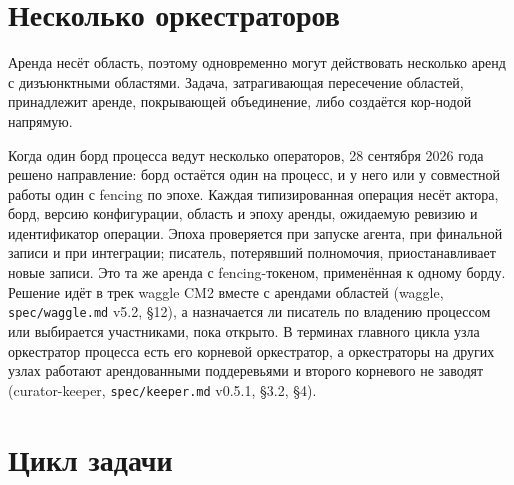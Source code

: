\section{Несколько оркестраторов}

Аренда несёт область, поэтому одновременно могут действовать несколько аренд с дизъюнктными областями. Задача, затрагивающая пересечение областей, принадлежит аренде, покрывающей объединение, либо создаётся кор-нодой напрямую.

Когда один борд процесса ведут несколько операторов, 28 сентября 2026 года решено направление: борд остаётся один на процесс, и у него или у совместной работы один  с fencing по эпохе. Каждая типизированная операция несёт актора, борд, версию конфигурации, область и эпоху аренды, ожидаемую ревизию и идентификатор операции. Эпоха проверяется при запуске агента, при финальной записи и при интеграции; писатель, потерявший полномочия, приостанавливает новые записи. Это та же аренда с fencing-токеном, применённая к одному борду. Решение идёт в трек waggle CM2 вместе с арендами областей (waggle, \texttt{spec/waggle.md} v5.2, §12), а назначается ли писатель по владению процессом или выбирается участниками, пока открыто. В терминах главного цикла узла оркестратор процесса есть его корневой оркестратор, а оркестраторы на других узлах работают арендованными поддеревьями и второго корневого не заводят (curator-keeper, \texttt{spec/keeper.md} v0.5.1, §3.2, §4).

\section{Цикл задачи}

\begin{center}
\end{center}

